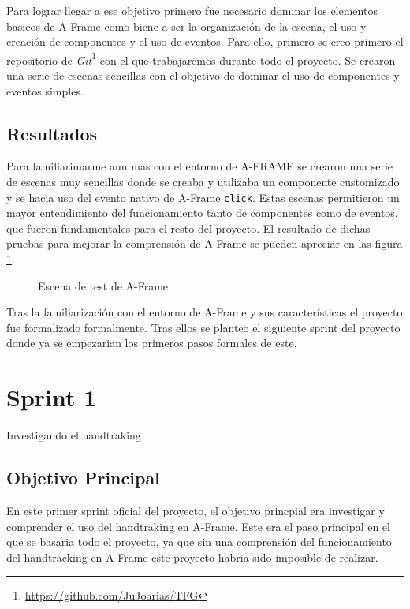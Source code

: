 \documentclass[a4paper, 12pt]{book}
\begin{document}
Para lograr llegar a ese objetivo primero fue necesario dominar los elementos basicos de A-Frame como biene a ser la organización de la escena, el uso y creación de componentes y el uso de eventos. 
Para ello, primero se creo primero el repositorio de \textit{Git}\footnote{\url{https://github.com/JuJoarias/TFG}}  con el que trabajaremos durante todo el proyecto. Se crearon una serie de escenas sencillas con el objetivo de dominar el uso de componentes y eventos simples. 
\subsection{Resultados}
\label{subsec:resultados0}
Para familiarimarme aun mas con el entorno de A-FRAME se crearon una serie de escenas muy sencillas donde se creaba y utilizaba un componente customizado y se hacia uso del evento nativo de A-Frame \texttt{click}. Estas escenas permitieron un mayor entendimiento del funcionamiento tanto de componentes como de eventos, que fueron fundamentales para el resto del proyecto.
El resultado de dichas pruebas para mejorar la comprensión de A-Frame se pueden apreciar en las figura \ref{fig:sprint0}.
\begin{figure}[H] 
  \centering
  \fbox{\rule{0pt}{150pt} \rule{0.7\textwidth}{0pt}} 
  \caption{Escena de test de A-Frame}
  \label{fig:sprint0}
\end{figure}

Tras la familiarización con el entorno de A-Frame y sus características el proyecto fue formalizado formalmente. Tras ellos se planteo el siguiente sprint del proyecto donde ya se empezarian los primeros pasos formales de este. 

\section{Sprint 1}
\label{sec:sprint1}
Investigando el handtraking

\subsection{Objetivo Principal}
\label{subsec:objetivo-principal1}
En este primer sprint oficial del proyecto, el objetivo princpial era investigar y comprender el uso del handtraking en A-Frame. 
Este era el paso principal en el que se basaria todo el proyecto, ya que sin una comprensión del funcionamiento del handtracking en A-Frame este proyecto habria sido imposible de realizar.
\end{document}
